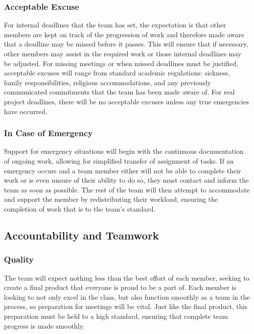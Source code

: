 \documentclass{article}
\begin{document}
\subsubsection*{Acceptable Excuse}

For internal deadlines that the team has set, the expectation is that other members are kept on track of the progression of work and therefore 
made aware that a deadline may be missed before it passes. This will ensure that if necessary, other members may assist in the required work or those 
internal deadlines may be adjusted. For missing meetings or when missed deadlines must be justified, acceptable excuses will range from standard 
academic regulations: sickness, family responsibilities, religious accommodations, and any previously communicated commitments that the team has been made aware 
of. For real project deadlines, there will be no acceptable excuses unless any true emergencies have occurred.

\subsubsection*{In Case of Emergency}

Support for emergency situations will begin with the continuous documentation of ongoing work, allowing for simplified transfer of assignment of tasks.
If an emergency occurs and a team member either will not be able to complete their work or is even unsure of their ability to do so, they must contact and inform 
the team as soon as possible. The rest of the team will then attempt to accommodate and support the member by redistributing their workload, 
ensuring the completion of work that is to the team's standard.

\subsection*{Accountability and Teamwork}

\subsubsection*{Quality} 

The team will expect nothing less than the best effort of each member, seeking to create a final product 
that everyone is proud to be a part of. Each member is looking to not only excel in the class, but also 
function smoothly as a team in the process, so preparation for meetings will be vital. Just like the final 
product, this preparation must be held to a high standard, ensuring that complete team progress is made 
smoothly.
\end{document}
